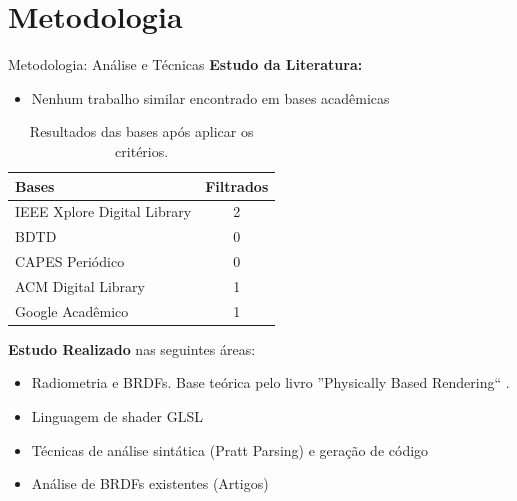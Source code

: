\section{Metodologia}

\begin{frame}{Metodologia: Análise e Técnicas}
      \textbf{Estudo da Literatura:}
             \begin{itemize}
                 \item Nenhum trabalho similar encontrado em bases acadêmicas
             \end{itemize}

\begin{table}[H]
\scriptsize
  \caption{\tiny Resultados das bases após aplicar os critérios.}
\label{tab-result}
\begin{tabular}{l|c}
\scriptsize
   \textbf{Bases}  & \textbf{Filtrados}\\
   \hline
    IEEE Xplore Digital Library
   & 2
    \\ \hline
    BDTD
    & 0
    \\ \hline
    CAPES Periódico
    & 0
    \\ \hline


  ACM Digital Library
  & 1
    \\ \hline
 Google Acadêmico
  & 1
\end{tabular}
\end{table}
       
      \textbf{Estudo Realizado} nas seguintes áreas:
             \begin{itemize}
                 \item Radiometria e BRDFs. Base teórica pelo livro ''Physically Based Rendering`` \cite{pbr}.
                 \item Linguagem de shader GLSL
                 \item Técnicas de análise sintática (Pratt Parsing) e geração de código
                 \item Análise de BRDFs existentes (Artigos)
             \end{itemize}

\end{frame}

